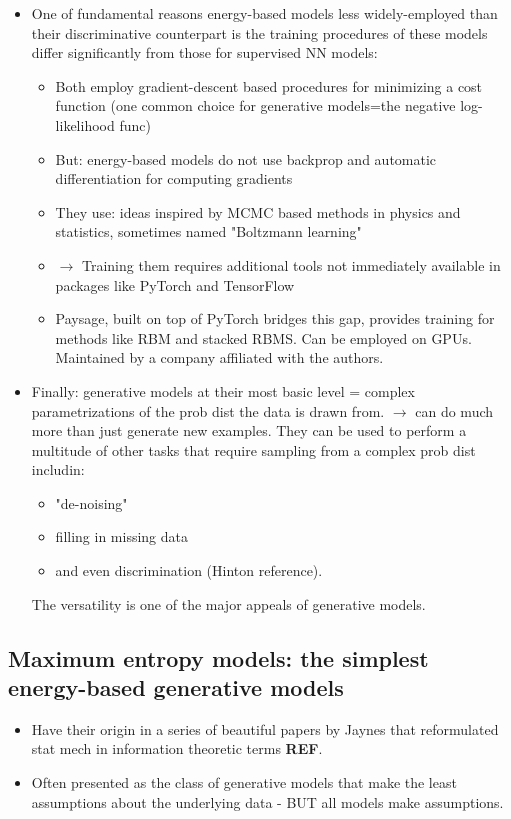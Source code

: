 \documentclass[norsk,a4paper,11pt]{article}
\begin{document}
\begin{itemize}
\begin{enumerate}
	\end{enumerate}
	\item One of fundamental reasons energy-based models less widely-employed than their discriminative counterpart is the training procedures of these models differ significantly from those for supervised NN models:
	\begin{itemize}
		\item Both employ gradient-descent based procedures for minimizing a cost function (one common choice for generative models=the negative log-likelihood func)
		\item But: energy-based models do not use backprop and automatic differentiation for computing gradients
		\item They use: ideas inspired by MCMC based methods in physics and statistics, sometimes named "Boltzmann learning"
		\item $\rightarrow$ Training them requires additional tools not immediately available in packages like PyTorch and TensorFlow
		\item Paysage, built on top of PyTorch bridges this gap, provides training for methods like RBM and stacked RBMS. Can be employed on GPUs. Maintained by a company affiliated with the authors.
	\end{itemize}
	\item Finally: generative models at their most basic level = complex parametrizations of the prob dist the data is drawn from. $\rightarrow$ can do much more than just generate new examples. They can be used to perform a multitude of other tasks that require sampling from a complex prob dist includin:
	\begin{itemize}
		\item "de-noising"
		\item filling in missing data
		\item and even discrimination (Hinton reference).
	\end{itemize}
	The versatility is one of the major appeals of generative models.
\end{itemize}

\subsection{Maximum entropy models: the simplest energy-based generative models}
\begin{itemize}
	\item Have their origin in a series of beautiful papers by Jaynes that reformulated stat mech in information theoretic terms \textbf{REF}. 
	\item Often presented as the class of generative models that make the least assumptions about the underlying data - BUT all models make assumptions.
\end{itemize}
\end{document}
